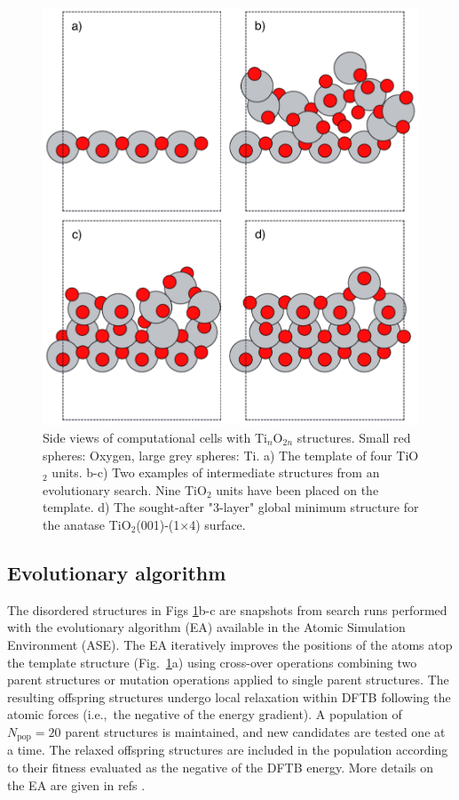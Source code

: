 \documentclass[aip,amsmath,amssymb,reprint]{revtex4-1}
\begin{document}
\begin{figure}[tb]
    \centering
    \includegraphics[width=1.0\columnwidth]{fig1-intro.pdf}
    \caption{Side views of computational cells with Ti$_{n}$O$_{2n}$ structures.
      Small red spheres: Oxygen, large grey spheres: Ti.
      a) The template of four TiO$_2$ units.
      b-c) Two examples of intermediate structures from an evolutionary search. Nine TiO$_2$ units
      have been placed on the template.
      d) The sought-after "3-layer" global minimum structure for the anatase TiO$_2$(001)-(1$\times$4) surface.
    }
    \label{figintro}
\end{figure}

\subsection{Evolutionary algorithm}
The disordered structures in Figs \ref{figintro}b-c are snapshots from
search runs performed with the evolutionary algorithm (EA) available
in the Atomic Simulation Environment (ASE)\cite{ase2}.  The EA
iteratively improves the positions of the atoms atop the template
structure (Fig.\ \ref{figintro}a) using cross-over operations
combining two parent structures or mutation operations applied to
single parent structures. The resulting offspring structures undergo
local relaxation within DFTB following the atomic forces (i.e.,\ the negative of
the energy gradient). A population of $N_\mathrm{pop}=20$ parent structures
is maintained, and new candidates are tested one at a time.
The relaxed offspring structures are included in the population
according to their fitness evaluated as the negative of the DFTB energy.
More details on the EA are given in refs \cite{Vilhelmsen2012, Vilhelmsen2014}.
\end{document}
